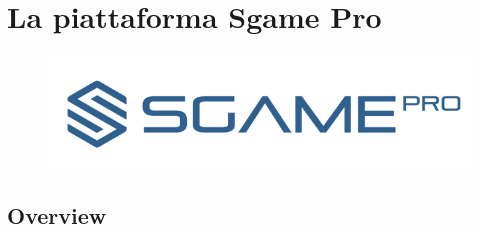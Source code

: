 \documentclass[11pt]{thesistemp}
\begin{document}
\section{La piattaforma Sgame Pro}
\begin{figure}[h]\hfill
    \centering
    \includegraphics[width=\textwidth]{sgamepro-logo.png}
    \label{fig:sgamepro}
\end{figure}

\subsection{Overview}
\end{document}
